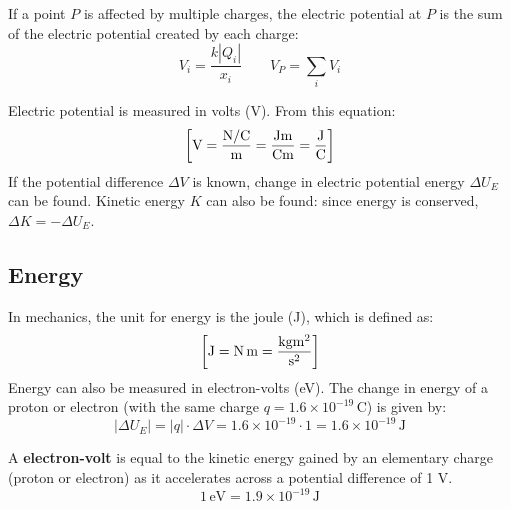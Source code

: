 \documentclass{article}
\newcommand{\definition}[1]{\begin{tcolorbox}[colback=red!5!white,colframe=red!75!black,parbox=false] #1 \end{tcolorbox}}
\begin{document}
If a point $P$ is affected by multiple charges, the electric potential at $P$ is the sum of the electric potential created by each charge:
\begin{equation*}
    V_i=\frac{k \left|Q_i\right|}{x_i}
	\qquad
	V_P=\sum_i V_i
\end{equation*}

Electric potential is measured in volts (V). From this equation:
\begin{equation*}
	\left[ \si{\volt}=\si{\frac{\newton\per\coulomb}{\meter} }=\si{\frac{\joule\meter}{\coulomb\meter}}=\si{\frac{\joule}{\coulomb}}\right]
\end{equation*}
If the potential difference $\Delta V$ is known, change in electric potential energy $\Delta U_E$ can be found. Kinetic energy $K$ can also be found: since energy is conserved, $\Delta K=-\Delta U_E$.

\subsection{Energy}

In mechanics, the unit for energy is the joule (J), which is defined as:
\begin{equation*}
	\left[ \si{J}=\si{\newton\meter}=\si{\frac{\kilo\gram\meter^2}{\second^2}} \right]
\end{equation*}
Energy can also be measured in electron-volts (eV). The change in energy of a proton or electron (with the same charge $q=1.6\times 10^{-19}\,\si{\coulomb}$) is given by:
\begin{equation*}
    \left|\Delta U_E\right|
	=\left|q\right|\cdot \Delta V
	=1.6\times 10^{-19}\cdot 1
	=1.6\times 10^{-19}\,\si{\joule}
\end{equation*}
\definition{A \textbf{electron-volt} is equal to the kinetic energy gained by an elementary charge (proton or electron) as it accelerates across a potential difference of 1 V.
\begin{equation*}
	1\,\si{\electronvolt}=1.9\times 10^{-19}\,\si{\joule}
\end{equation*}}
\end{document}
